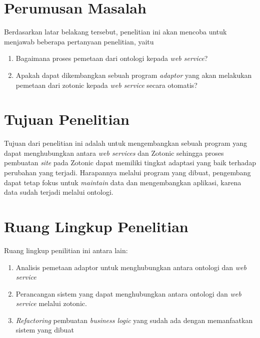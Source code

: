 \section{Perumusan Masalah}
Berdasarkan latar belakang tersebut, penelitian ini akan mencoba untuk menjawab beberapa pertanyaan penelitian, yaitu
\begin{enumerate}
\item Bagaimana proses pemetaan dari ontologi kepada \textit{web service}?
\item Apakah dapat dikembangkan sebuah program \textit{adaptor} yang akan melakukan pemetaan dari zotonic kepada \textit{web service} secara otomatis?
\end{enumerate}
\section{Tujuan Penelitian}
Tujuan dari penelitian ini adalah untuk mengembangkan sebuah program yang dapat menghubungkan antara \textit{web services} dan Zotonic sehingga proses pembuatan \textit{site} pada Zotonic dapat memiliki tingkat adaptasi yang baik terhadap perubahan yang terjadi. Harapannya melalui program yang dibuat, pengembang dapat tetap fokus untuk \textit{maintain} data dan mengembangkan aplikasi, karena data sudah terjadi melalui ontologi.

\section{Ruang Lingkup Penelitian}

Ruang lingkup penilitian ini antara lain:
\begin{enumerate}
\item Analisis pemetaan adaptor untuk menghubungkan antara ontologi dan \textit{web service}
\item Perancangan sistem yang dapat menghubungkan antara ontologi dan \textit{web service} melalui zotonic.
\item \textit{Refactoring} pembuatan \textit{business logic} yang sudah ada dengan memanfaatkan sistem yang dibuat
\end{enumerate}

